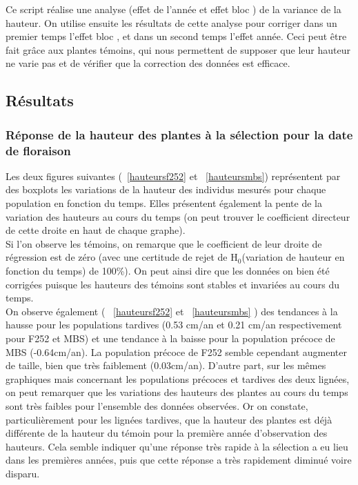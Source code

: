 \documentclass[12pt,a4paper]{article}
\begin{document}
			 				Ce script réalise une analyse (effet de l'année et \og effet bloc \fg) de la variance de la hauteur. On utilise ensuite les résultats de cette analyse pour corriger dans un premier temps l'\og effet bloc \fg, et dans un second temps l'effet année. Ceci peut être fait grâce aux plantes témoins, qui nous permettent de supposer que leur hauteur ne varie pas et de vérifier que la correction des données est efficace.
			 				
			 		\subsection{Résultats}
			 			
			 			\subsubsection{Réponse de la hauteur des plantes à la sélection pour la date de floraison}
			 				
			 				Les deux figures suivantes (~\ref{hauteursf252} et ~\ref{hauteursmbs}) représentent par des boxplots les variations de la hauteur des individus mesurés pour chaque population en fonction du temps. Elles présentent également la pente de la variation des hauteurs au cours du temps (on peut trouver le coefficient directeur de cette droite en haut de chaque graphe).\\
			 				Si l'on observe les témoins, on remarque que le coefficient de leur droite de régression est de zéro (avec une certitude de rejet de H$_0$(variation de hauteur en fonction du temps) de 100\%). On peut ainsi dire que les données on bien été corrigées puisque les hauteurs des témoins sont stables et invariées au cours du temps.\\
			 				
			 				On observe également ( \bsc{Figure}~\ref{hauteursf252} et ~\ref{hauteursmbs} ) des tendances à la hausse pour les populations tardives (0.53 cm/an et 0.21 cm/an respectivement pour F252 et MBS)  et une tendance à la baisse pour la population précoce de MBS (-0.64cm/an). La population précoce de F252 semble cependant augmenter de taille, bien que très faiblement (0.03cm/an).		 				
			 				D'autre part, sur les mêmes graphiques mais concernant les populations précoces et tardives des deux lignées, on peut remarquer que les variations des hauteurs des plantes au cours du temps sont très faibles pour l'ensemble des données observées. Or on constate, particulièrement pour les lignées tardives, que la hauteur des plantes est déjà différente de la hauteur du témoin pour la première année d'observation des hauteurs. Cela semble indiquer qu'une réponse très rapide à la sélection a eu lieu dans les premières années, puis que cette réponse a très rapidement diminué voire disparu.
			 				
\end{document}
